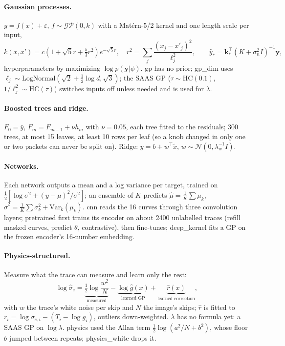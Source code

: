 \documentclass[11pt]{article}
\begin{document}
\paragraph{Gaussian processes.} $y=f(x)+\varepsilon$, $f\sim\mathcal{GP}(0,k)$ with a Mat\'ern-5/2 kernel and one
length scale per input,
\begin{equation}
k(x,x')=c\left(1+\sqrt5r+\tfrac53r^2\right)e^{-\sqrt5r},\quad r^2=\sum_j\frac{(x_j-x'_j)^2}{\ell_j^2},\qquad
\hat y_*=\mathbf k_*^\top(K+\sigma_n^2I)^{-1}\mathbf y,
\end{equation}
hyperparameters by maximizing $\log p(\mathbf y|\phi)$. gp has no prior; gp\_dim uses
$\ell_j\sim\mathrm{LogNormal}(\sqrt2+\tfrac12\log d,\sqrt3)$; the SAAS GP ($\tau\sim\mathrm{HC}(0.1)$,
$1/\ell_j^2\sim\mathrm{HC}(\tau)$) switches inputs off unless needed and is used for $\lambda$.

\paragraph{Boosted trees and ridge.} $F_0=\bar y$, $F_m=F_{m-1}+\nu h_m$ with $\nu=0.05$, each tree fitted to the
residuals; 300 trees, at most 15 leaves, at least 10 rows per leaf (so a knob changed in only one or two packets can
never be split on). Ridge: $y=b+w^\top\tilde x$, $w\sim\mathcal N(0,\lambda_w^{-1}I)$.

\paragraph{Networks.} Each network outputs a mean and a log variance per target, trained on
$\tfrac12[\log\sigma^2+(y-\mu)^2/\sigma^2]$; an ensemble of $K$ predicts $\hat\mu=\tfrac1K\sum\mu_k$,
$\hat\sigma^2=\tfrac1K\sum\sigma_k^2+\mathrm{Var}_k(\mu_k)$. cnn reads the 16 curves through three convolution
layers; pretrained first trains its encoder on about 2400 unlabelled traces (refill masked curves, predict $\theta$,
contrastive), then fine-tunes; deep\_kernel fits a GP on the frozen encoder's 16-number embedding.

\paragraph{Physics-structured.} Measure what the trace can measure and learn only the rest:
\begin{equation}
\log\hat\sigma_e=\underbrace{\tfrac12\log\frac{w^2}{N}}_{\text{measured}}-\underbrace{\log\hat g(x)}_{\text{learned GP}}+\underbrace{\hat r(x)}_{\text{learned correction}},
\end{equation}
with $w$ the trace's white noise per skip and $N$ the image's skips; $\hat r$ is fitted to
$r_i=\log\sigma_{e,i}-(T_i-\log g_i)$, outliers down-weighted. $\lambda$ has no formula yet: a SAAS GP on $\log\lambda$.
physics used the Allan term $\tfrac12\log(a^2/N+b^2)$, whose floor $b$ jumped between repeats; physics\_white drops it.
\end{document}
